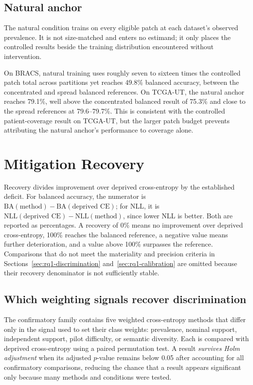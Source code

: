 \documentclass[11pt]{article}
\newcommand{\resultstable}[1]{}
\begin{document}
\subsection{Natural anchor}
\label{sec:rq1-routing}
The natural condition trains on every eligible patch at each dataset's observed prevalence. It is not size-matched and enters no estimand; it only places the controlled results beside the training distribution encountered without intervention.

\begin{table}[H]
  \centering
  \footnotesize
  \resultstable{natural_anchor_summary}
  \caption{Natural and balanced cross-entropy anchors.}
  \label{tab:natural-anchor}
\end{table}

\noindent On BRACS, natural training uses roughly seven to sixteen times the controlled patch total across partitions yet reaches \num{49.8}\% balanced accuracy, between the concentrated and spread balanced references. On TCGA-UT, the natural anchor reaches \num{79.1}\%, well above the concentrated balanced result of \num{75.3}\% and close to the spread references at \num{79.6}--\num{79.7}\%. This is consistent with the controlled patient-coverage result on TCGA-UT, but the larger patch budget prevents attributing the natural anchor's performance to coverage alone.

\section{Mitigation Recovery}
\label{sec:rq2}
Recovery divides improvement over deprived cross-entropy by the established deficit. For balanced accuracy, the numerator is $\mathrm{BA}(\text{method})-\mathrm{BA}(\text{deprived CE})$; for NLL, it is $\mathrm{NLL}(\text{deprived CE})-\mathrm{NLL}(\text{method})$, since lower NLL is better. Both are reported as percentages. A recovery of \num{0}\% means no improvement over deprived cross-entropy, \num{100}\% reaches the balanced reference, a negative value means further deterioration, and a value above \num{100}\% surpasses the reference. Comparisons that do not meet the materiality and precision criteria in Sections~\ref{sec:rq1-discrimination} and~\ref{sec:rq1-calibration} are omitted because their recovery denominator is not sufficiently stable.

\subsection{Which weighting signals recover discrimination}
\label{sec:rq2-family}
The confirmatory family contains five weighted cross-entropy methods that differ only in the signal used to set their class weights: prevalence, nominal support, independent support, pilot difficulty, or semantic diversity. Each is compared with deprived cross-entropy using a paired permutation test. A result \emph{survives Holm adjustment} when its adjusted $p$-value remains below \num{0.05} after accounting for all confirmatory comparisons, reducing the chance that a result appears significant only because many methods and conditions were tested.
\end{document}
